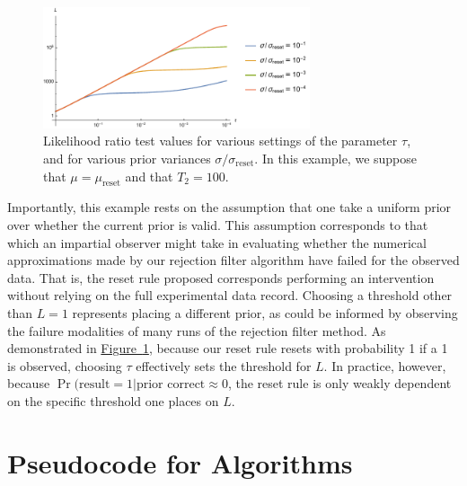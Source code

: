 \documentclass[aps,pra,amsmath,twocolumn,amssymb,superscriptaddress]{revtex4-1}
\newcommand{\reset}{\mathrm{reset}}
\newcommand{\fig}[1]{\hyperref[fig:#1]{Figure~\ref*{fig:#1}}}
\begin{document}
\begin{figure}
    \begin{center}
        \includegraphics[width=0.7\textwidth]{reset-bf-thresholds.pdf}
    \end{center}
    \caption{
        \label{fig:reset-bf-thresholds}
        Likelihood ratio test values for various settings of the parameter
        $\tau$, and for various prior variances $\sigma / \sigma_\reset$.
        In this example, we suppose that $\mu = \mu_\reset$ and that $T_2 = 100$.
    }
\end{figure}

Importantly, this example rests on the assumption that one take a uniform
prior over whether the current prior is valid. This assumption corresponds to
that which an impartial observer might take in evaluating whether the numerical
approximations made by our rejection filter algorithm have failed for the
observed data. That is, the reset rule proposed corresponds performing an intervention
without relying on the full experimental data record. Choosing a threshold
other than $L = 1$ represents placing a different prior, as could be informed by observing
the failure modalities of many runs of the rejection filter method. As
demonstrated in \fig{reset-bf-thresholds}, because our reset rule resets with
probability 1 if a 1 is observed, choosing $\tau$ effectively sets the threshold
for $L$.
In practice,
however, because $\Pr(\text{result} = 1 | \text{prior correct} \approx 0$, the reset
rule is only weakly dependent on the specific threshold one places on $L$.


\section{Pseudocode for Algorithms}
\label{app:pseudocode}
\end{document}
